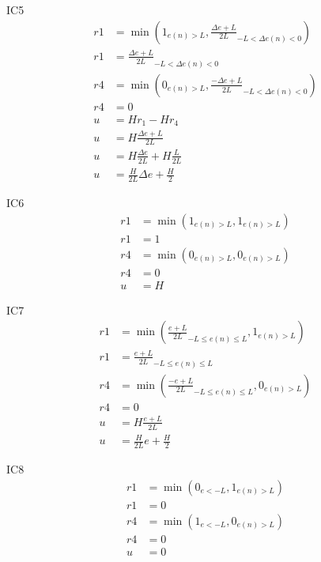 IC5
\begin{equation}
\begin{split}
    r1&=\min{\left(1_{e(n)>L},\frac{\Delta e+L}{2L}_{-L<\Delta e(n)<0}\right)}\\
    r1&=\frac{\Delta e+L}{2L}_{-L<\Delta e(n)<0}\\
    r4&=\min{\left(0_{e(n)>L},\frac{-\Delta e+L}{2L}_{-L<\Delta e(n)<0}\right)}\\
    r4&=0\\
    u&=Hr_1-Hr_4\\
    u&=H\frac{\Delta e+L}{2L}\\
    u&=H\frac{\Delta e}{2L}+H\frac{L}{2L}\\
    u&=\frac{H}{2L}\Delta e+\frac{H}{2}
\end{split}
\end{equation}

IC6
\begin{equation}
\begin{split}
    r1&=\min{\left(1_{e(n)>L},1_{e(n)>L}\right)}\\
    r1&=1\\
    r4&=\min{\left(0_{e(n)>L},0_{e(n)>L}\right)}\\
    r4&=0\\
    u&=H
\end{split}
\end{equation}

IC7
\begin{equation}
\begin{split}
    r1&=\min{\left(\frac{e+L}{2L}_{-L\leq e(n)\leq L},1_{e(n)>L}\right)}\\
    r1&=\frac{e+L}{2L}_{-L\leq e(n)\leq L}\\
    r4&=\min{\left(\frac{-e+L}{2L}_{-L\leq e(n)\leq L},0_{e(n)>L}\right)}\\
    r4&=0\\
    u&=H\frac{e+L}{2L}\\
    u&=\frac{H}{2L}e+\frac{H}{2}
\end{split}
\end{equation}

IC8
\begin{equation}
\begin{split}
    r1&=\min{\left(0_{e<-L},1_{e(n)>L}\right)}\\
    r1&=0\\
    r4&=\min{\left(1_{e<-L},0_{e(n)>L}\right)}\\
    r4&=0\\
    u&=0
\end{split}
\end{equation}

